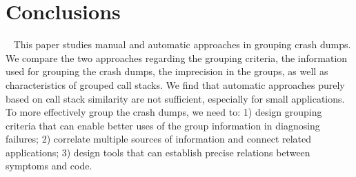\section{Conclusions}~\label{sec:conclusions}
This paper studies manual and automatic approaches in grouping crash dumps.  We compare the two approaches regarding the grouping criteria, the information used for grouping the crash dumps, the imprecision in the groups, as well as characteristics of grouped call stacks. We find that automatic approaches purely based on call stack similarity are not sufficient, especially for small applications. To more effectively group the crash dumps, we need to: 1) design grouping criteria that can enable better uses of the group information in diagnosing failures; 2) correlate multiple sources of information and connect related applications; 3) design tools that can establish precise relations between symptoms and code.

